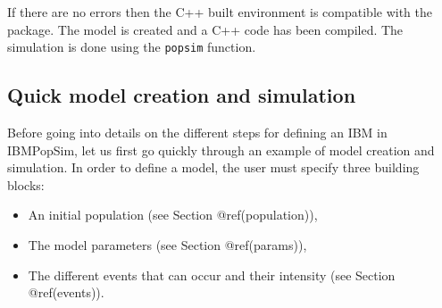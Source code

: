 If there are no errors then the C++ built environment is compatible with the package. The model is created and a C++ code has been compiled. The simulation is done using the \texttt{popsim} function.

\begin{Shaded}
\begin{Highlighting}[]
\OtherTok{\textless{}{-}} \NormalTok{(}
                   \NormalTok{(} \OtherTok{=}\SpecialCharTok{$} \OtherTok{=}\SpecialCharTok{$}
                   \NormalTok{)}

\OtherTok{\textless{}{-}} \SpecialCharTok{$}\SpecialCharTok{$}\SpecialCharTok{{-}}
\OtherTok{\textless{}{-}} \NormalTok{(}\SpecialCharTok{!}\SpecialCharTok{$}\SpecialCharTok{$}
\NormalTok{(}\NormalTok{(} \OtherTok{=} \OtherTok{=}
\end{Highlighting}
\end{Shaded}

\hypertarget{quick-model-creation-and-simulation}{%
\subsection{Quick model creation and simulation}\label{quick-model-creation-and-simulation}}

Before going into details on the different steps for defining an IBM in IBMPopSim, let us first go quickly through an example of model creation and simulation.
In order to define a model, the user must specify three building blocks:

\begin{itemize}
\tightlist
\item
  An initial population (see Section @ref(population)),
\item
  The model parameters (see Section @ref(params)),
\item
  The different events that can occur and their intensity (see Section @ref(events)).
\end{itemize}

